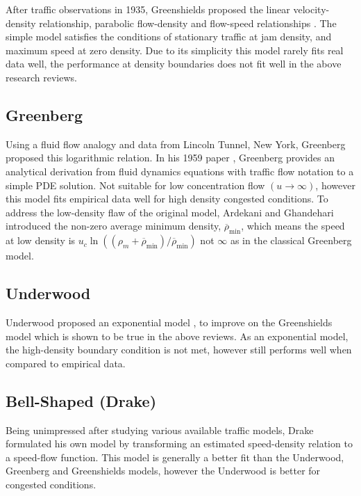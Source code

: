 		After traffic observations in 1935, Greenshields proposed the linear velocity-density relationship, parabolic flow-density and flow-speed relationships \cite{Greenshields35}. The simple model satisfies the conditions of stationary traffic at jam density, and maximum speed at zero density. Due to its simplicity this model rarely fits real data well, the performance at density boundaries does not fit well in the above research reviews. 

\subsection*{Greenberg}

		Using a fluid flow analogy and data from Lincoln Tunnel, New York, Greenberg proposed this logarithmic relation. In his 1959 paper \cite{Greenberg59}, Greenberg provides an analytical derivation from fluid dynamics equations with traffic flow notation to a simple PDE solution. Not suitable for low concentration flow $(u\rightarrow\infty)$, however this model fits empirical data well for high density congested conditions. To address the low-density flaw of the original model, Ardekani and Ghandehari \cite{Ardekani08} introduced the non-zero average minimum density, $\overline\rho_{\min}$, which means the speed at low density is $u_c\ln\left((\rho_m+\overline\rho_{\min})/\overline\rho_{\min}\right)$ not $\infty$ as in the classical Greenberg model.

\subsection*{Underwood}

		Underwood proposed an exponential model \cite{Underwood61}, to improve on the Greenshields model which is shown to be true in the above reviews. As an exponential model, the high-density boundary condition is not met, however still performs well when compared to empirical data. 

\subsection*{Bell-Shaped (Drake)}

		Being unimpressed after studying various available traffic models, Drake \cite{Drake67} formulated his own model by transforming an estimated speed-density relation to a speed-flow function. This model is generally a better fit than the Underwood, Greenberg and Greenshields models, however the Underwood is better for congested conditions.

